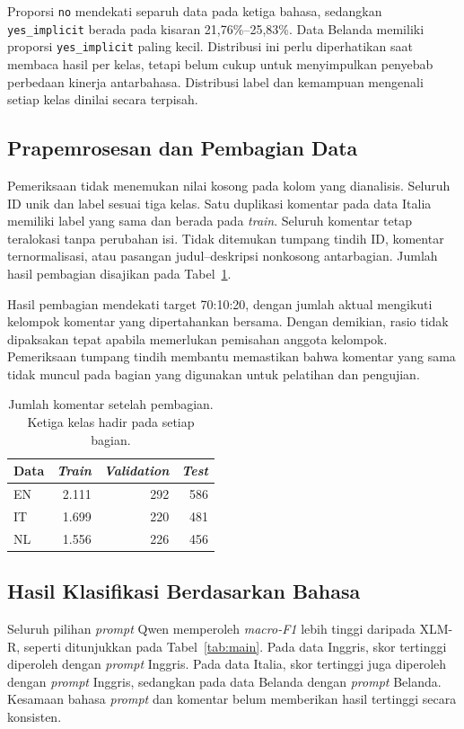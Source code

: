 \documentclass[11pt]{article}
\begin{document}
Proporsi \texttt{no} mendekati separuh data pada ketiga bahasa, sedangkan \texttt{yes\_implicit} berada pada kisaran 21,76\%--25,83\%. Data Belanda memiliki proporsi \texttt{yes\_implicit} paling kecil. Distribusi ini perlu diperhatikan saat membaca hasil per kelas, tetapi belum cukup untuk menyimpulkan penyebab perbedaan kinerja antarbahasa. Distribusi label dan kemampuan mengenali setiap kelas dinilai secara terpisah.

\subsection{Prapemrosesan dan Pembagian Data}
Pemeriksaan tidak menemukan nilai kosong pada kolom yang dianalisis. Seluruh ID unik dan label sesuai tiga kelas. Satu duplikasi komentar pada data Italia memiliki label yang sama dan berada pada \textit{train}. Seluruh komentar tetap teralokasi tanpa perubahan isi. Tidak ditemukan tumpang tindih ID, komentar ternormalisasi, atau pasangan judul--deskripsi nonkosong antarbagian. Jumlah hasil pembagian disajikan pada Tabel~\ref{tab:split}.

Hasil pembagian mendekati target 70:10:20, dengan jumlah aktual mengikuti kelompok komentar yang dipertahankan bersama. Dengan demikian, rasio tidak dipaksakan tepat apabila memerlukan pemisahan anggota kelompok. Pemeriksaan tumpang tindih membantu memastikan bahwa komentar yang sama tidak muncul pada bagian yang digunakan untuk pelatihan dan pengujian.

\begin{table}[t]
\centering\small
\begin{tabular}{lrrr}
\toprule
Data & \textit{Train} & \textit{Validation} & \textit{Test} \\
\midrule
EN & 2.111 & 292 & 586 \\
IT & 1.699 & 220 & 481 \\
NL & 1.556 & 226 & 456 \\
\bottomrule
\end{tabular}
\caption{Jumlah komentar setelah pembagian. Ketiga kelas hadir pada setiap bagian.}
\label{tab:split}
\end{table}

\subsection{Hasil Klasifikasi Berdasarkan Bahasa}
Seluruh pilihan \textit{prompt} Qwen memperoleh \textit{macro-F1} lebih tinggi daripada XLM-R, seperti ditunjukkan pada Tabel~\ref{tab:main}. Pada data Inggris, skor tertinggi diperoleh dengan \textit{prompt} Inggris. Pada data Italia, skor tertinggi juga diperoleh dengan \textit{prompt} Inggris, sedangkan pada data Belanda dengan \textit{prompt} Belanda. Kesamaan bahasa \textit{prompt} dan komentar belum memberikan hasil tertinggi secara konsisten.
\end{document}

